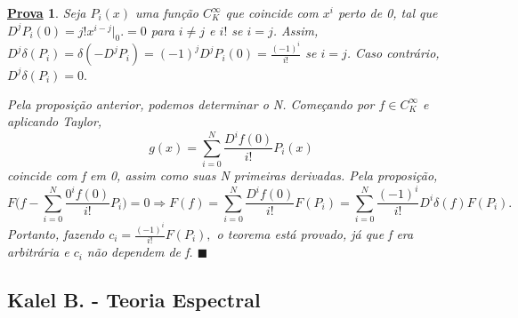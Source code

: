 \documentclass{article}
\newtheorem*{proof*}{\underline{Prova}}
\renewcommand\qedsymbol{$\blacksquare$}
\begin{document}
\begin{proof*}
  Seja \(P_{i}(x)\) uma função \(C_{K}^{\infty}\) que coincide com \(x^{i}\) perto de 0, tal que \(D^{j}P_{i}(0) = j!x^{i-j}\biggl|_{0}^{}\biggr. =0\) para \(i\neq j\) e \(i!\) se \(i= j\). Assim, 
  \(D^{j}\delta (P_{i}) = \delta (-D^{j}P_{i}) = (-1)^{j}D^{j}P_{i}(0) = \frac{(-1)^{i}}{i!}\) se \(i = j\). Caso contrário, \(D^{j}\delta (P_{i}) = 0.\)

    Pela proposição anterior, podemos determinar o N. Começando por \(f\in C_{K}^{\infty}\) e aplicando Taylor,
      \[
        g(x) = \sum\limits_{i=0}^{N}\frac{D^{i}f(0)}{i!}P_{i}(x)
      \]
  coincide com f em 0, assim como suas N primeiras derivadas. Pela proposição, 
    \[
      F \biggl(f - \sum\limits_{i=0}^{N}\frac{0^{i}f(0)}{i!}P_{i}\biggr) = 0 \Rightarrow F(f) = \sum\limits_{i=0}^{N}\frac{D^{i}f(0)}{i!}F(P_{i}) = \sum\limits_{i=0}^{N} \frac{(-1)^{i}}{i!}D^{i}\delta (f)F(P_{i}).
    \]
    Portanto, fazendo \(c_{i} = \frac{(-1)^{i}}{i!}F(P_{i}),\) o teorema está provado, já que f era arbitrária e \(c_{i}\) não dependem de f. \qedsymbol
\end{proof*}

  \subsection{Kalel B. - Teoria Espectral}
\end{document}
